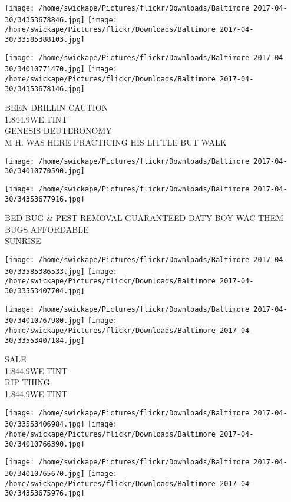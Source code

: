 \documentclass[10pt,letterpaper]{article}
\begin{document}
\texttt{[image: /home/swickape/Pictures/flickr/Downloads/Baltimore 2017-04-30/34353678846.jpg]}
\texttt{[image: /home/swickape/Pictures/flickr/Downloads/Baltimore 2017-04-30/33585388103.jpg]}

\texttt{[image: /home/swickape/Pictures/flickr/Downloads/Baltimore 2017-04-30/34010771470.jpg]}
\texttt{[image: /home/swickape/Pictures/flickr/Downloads/Baltimore 2017-04-30/34353678146.jpg]}

BEEN DRILLIN CAUTION\\
1.844.9WE.TINT\\
GENESIS DEUTERONOMY\\
M H. WAS HERE PRACTICING HIS LITTLE BUT WALK
\pagebreak

\texttt{[image: /home/swickape/Pictures/flickr/Downloads/Baltimore 2017-04-30/34010770590.jpg]}

\vspace{0.25in}
\texttt{[image: /home/swickape/Pictures/flickr/Downloads/Baltimore 2017-04-30/34353677916.jpg]}

BED BUG \& PEST REMOVAL GUARANTEED DATY BOY WAC THEM BUGS AFFORDABLE\\
SUNRISE
\pagebreak

\texttt{[image: /home/swickape/Pictures/flickr/Downloads/Baltimore 2017-04-30/33585386533.jpg]}
\texttt{[image: /home/swickape/Pictures/flickr/Downloads/Baltimore 2017-04-30/33553407704.jpg]}

\texttt{[image: /home/swickape/Pictures/flickr/Downloads/Baltimore 2017-04-30/34010767980.jpg]}
\texttt{[image: /home/swickape/Pictures/flickr/Downloads/Baltimore 2017-04-30/33553407184.jpg]}

SALE\\
1.844.9WE.TINT\\
RIP THING\\
1.844.9WE.TINT
\pagebreak

\texttt{[image: /home/swickape/Pictures/flickr/Downloads/Baltimore 2017-04-30/33553406984.jpg]}
\texttt{[image: /home/swickape/Pictures/flickr/Downloads/Baltimore 2017-04-30/34010766390.jpg]}

\texttt{[image: /home/swickape/Pictures/flickr/Downloads/Baltimore 2017-04-30/34010765670.jpg]}
\texttt{[image: /home/swickape/Pictures/flickr/Downloads/Baltimore 2017-04-30/34353675976.jpg]}
\end{document}
